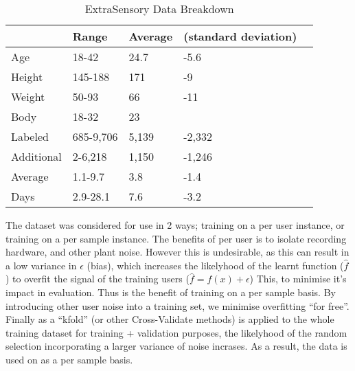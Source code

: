\documentclass{UoNMCHA}
\newcommand{\inlineQuote}[1]{``#1''}
\numberwithin{equation}{section}
\begin{document}
\begin{table}[h]
    \begin{center}  
        \caption{ExtraSensory Data Breakdown \cite{Vaizman2017}}\label{tab:ExtraSensoryDataBreakdown}
        \begin{tabular}{lllll}
            \hline\hline 
                       & Range     & Average & (standard deviation) &  \\
            \hline 
            Age        & 18-42     & 24.7    & -5.6                 &  \\
            Height     & 145-188   & 171     & -9                   &  \\
            Weight     & 50-93     & 66      & -11                  &  \\
            Body       & 18-32     & 23      &                      &  \\
            Labeled    & 685-9,706 & 5,139   & -2,332               &  \\
            Additional & 2-6,218   & 1,150   & -1,246               &  \\
            Average    & 1.1-9.7   & 3.8     & -1.4                 &  \\
            Days       & 2.9-28.1  & 7.6     & -3.2 \\
            \hline  
            \end{tabular}
    \end{center}
\end{table}

The dataset was considered for use in 2 ways; training on a per user instance, or training on a per sample instance. The benefits of per user is to isolate recording hardware, and other plant noise. However this is undesirable, as this can result in a low variance in $\epsilon$ (bias), which increases the likelyhood of the learnt function ($\hat{f}$) to overfit the signal of the training users ($ \hat{f} = f(x) + \epsilon$) This, to minimise it's impact in evaluation. Thus is the benefit of training on a per sample basis. By introducing other user noise into a training set, we minimise overfitting \inlineQuote{for free}. Finally as a \inlineQuote{kfold} (or other Cross-Validate methods) is applied to the whole training dataset for training + validation purposes, the likelyhood of the random selection incorporating a larger variance of noise incrases. As a result, the data is used on as a per sample basis.
\end{document}
